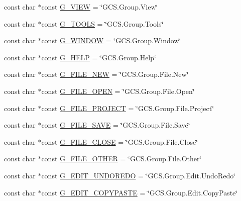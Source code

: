 \begin{DoxyCompactItemize}
\item 
const char $\ast$const \hyperlink{group___core_plugin_gaf8e643a4a904dceadb52cf47ba265ef9}{G\-\_\-\-V\-I\-E\-W} = \char`\"{}G\-C\-S.\-Group.\-View\char`\"{}
\item 
const char $\ast$const \hyperlink{group___core_plugin_ga70bfb468e022981f48ed5b8ea5e8bce1}{G\-\_\-\-T\-O\-O\-L\-S} = \char`\"{}G\-C\-S.\-Group.\-Tools\char`\"{}
\item 
const char $\ast$const \hyperlink{group___core_plugin_ga5831ce204fcff78e2b9a0981d6af4a4c}{G\-\_\-\-W\-I\-N\-D\-O\-W} = \char`\"{}G\-C\-S.\-Group.\-Window\char`\"{}
\item 
const char $\ast$const \hyperlink{group___core_plugin_ga227137f1a0f845bb147764080eb7f790}{G\-\_\-\-H\-E\-L\-P} = \char`\"{}G\-C\-S.\-Group.\-Help\char`\"{}
\item 
const char $\ast$const \hyperlink{group___core_plugin_ga8075f826c38d7ad64455fce1e27364b9}{G\-\_\-\-F\-I\-L\-E\-\_\-\-N\-E\-W} = \char`\"{}G\-C\-S.\-Group.\-File.\-New\char`\"{}
\item 
const char $\ast$const \hyperlink{group___core_plugin_ga0f564afaaccdd8bfb5d35a745f2aa002}{G\-\_\-\-F\-I\-L\-E\-\_\-\-O\-P\-E\-N} = \char`\"{}G\-C\-S.\-Group.\-File.\-Open\char`\"{}
\item 
const char $\ast$const \hyperlink{group___core_plugin_ga05ac3ebb994ab8c62e2f0ba17dc12b48}{G\-\_\-\-F\-I\-L\-E\-\_\-\-P\-R\-O\-J\-E\-C\-T} = \char`\"{}G\-C\-S.\-Group.\-File.\-Project\char`\"{}
\item 
const char $\ast$const \hyperlink{group___core_plugin_ga71aab5cd1940b131cfa9089cf7b6a6cc}{G\-\_\-\-F\-I\-L\-E\-\_\-\-S\-A\-V\-E} = \char`\"{}G\-C\-S.\-Group.\-File.\-Save\char`\"{}
\item 
const char $\ast$const \hyperlink{group___core_plugin_ga28053f6405254961f912a4635c3b5ea7}{G\-\_\-\-F\-I\-L\-E\-\_\-\-C\-L\-O\-S\-E} = \char`\"{}G\-C\-S.\-Group.\-File.\-Close\char`\"{}
\item 
const char $\ast$const \hyperlink{group___core_plugin_ga8ec0d7c0e60fc2e09f6936d0d385475d}{G\-\_\-\-F\-I\-L\-E\-\_\-\-O\-T\-H\-E\-R} = \char`\"{}G\-C\-S.\-Group.\-File.\-Other\char`\"{}
\item 
const char $\ast$const \hyperlink{group___core_plugin_ga2975c00095be592f9dc54342040fe08b}{G\-\_\-\-E\-D\-I\-T\-\_\-\-U\-N\-D\-O\-R\-E\-D\-O} = \char`\"{}G\-C\-S.\-Group.\-Edit.\-Undo\-Redo\char`\"{}
\item 
const char $\ast$const \hyperlink{group___core_plugin_ga6713439b668227888c67cb139db0a617}{G\-\_\-\-E\-D\-I\-T\-\_\-\-C\-O\-P\-Y\-P\-A\-S\-T\-E} = \char`\"{}G\-C\-S.\-Group.\-Edit.\-Copy\-Paste\char`\"{}

\end{DoxyCompactItemize}
